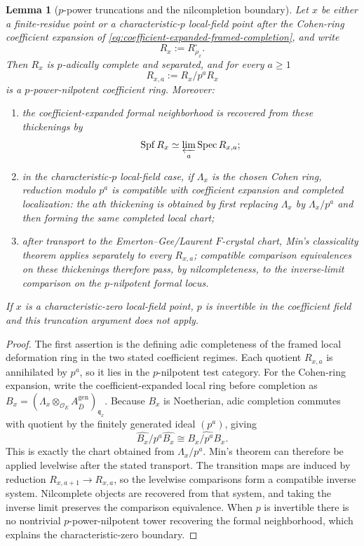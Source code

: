 \documentclass[11pt]{article}
\newtheorem{lemma}[theorem]{Lemma}
\theoremstyle{definition}
\begin{document}
\begin{lemma}[$p$-power truncations and the nilcompletion boundary]\label{lem:min-p-power-nilcompletion}
Let $x$ be either a finite-residue point or a characteristic-$p$ local-field
point after the Cohen-ring coefficient expansion of
\eqref{eq:coefficient-expanded-framed-completion}, and write
\[
 R_x:=R_{\rho_x}^{\square}.
\]
Then $R_x$ is $p$-adically complete and separated, and for every $a\ge1$
\[
 R_{x,a}:=R_x/p^aR_x
\]
is a $p$-power-nilpotent coefficient ring.  Moreover:
\begin{enumerate}[label=\textnormal{(\roman*)}]
\item the coefficient-expanded formal neighborhood is recovered from these
thickenings by
\[
 \operatorname{Spf}R_x
 \simeq
 \varprojlim_a\operatorname{Spec}R_{x,a};
\]
\item in the characteristic-$p$ local-field case, if $\Lambda_x$ is the
chosen Cohen ring, reduction modulo $p^a$ is compatible with coefficient
expansion and completed localization: the $a$th thickening is obtained by
first replacing $\Lambda_x$ by $\Lambda_x/p^a$ and then forming the same
completed local chart;
\item after transport to the Emerton--Gee/Laurent $F$-crystal chart, Min's
classicality theorem applies separately to every $R_{x,a}$; compatible
comparison equivalences on these thickenings therefore pass, by
nilcompleteness, to the inverse-limit comparison on the $p$-nilpotent formal
locus.
\end{enumerate}
If $x$ is a characteristic-zero local-field point, $p$ is invertible in the
coefficient field and this truncation argument does not apply.
\end{lemma}

\begin{proof}
The first assertion is the defining adic completeness of the framed local
deformation ring in the two stated coefficient regimes.  Each quotient
$R_{x,a}$ is annihilated by $p^a$, so it lies in the $p$-nilpotent test
category.  For the Cohen-ring expansion, write the coefficient-expanded
local ring before completion as
$B_x=(\Lambda_x\otimes_{\mathcal O_E}A_{\bar D}^{\mathrm{gen}})_{\mathfrak q_x}$.
Because $B_x$ is Noetherian, adic completion commutes with quotient by the
finitely generated ideal $(p^a)$, giving
\[
 \widehat{B_x}/p^a\widehat{B_x}
 \cong
 \widehat{B_x/p^aB_x}.
\]
This is exactly the chart obtained from $\Lambda_x/p^a$.  Min's theorem can
therefore be applied levelwise after the stated transport.  The transition
maps are induced by reduction $R_{x,a+1}\to R_{x,a}$, so the levelwise
comparisons form a compatible inverse system.  Nilcomplete objects are
recovered from that system, and taking the inverse limit preserves the
comparison equivalence.  When $p$ is invertible there is no nontrivial
$p$-power-nilpotent tower recovering the formal neighborhood, which explains
the characteristic-zero boundary.
\end{proof}
\end{document}
